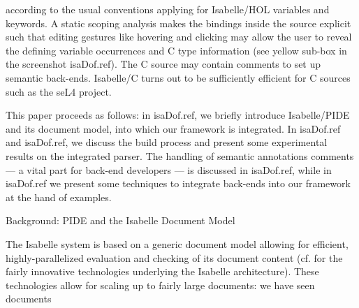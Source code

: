 \begin{isabellebody}
\begin{isamarkuptext}
according to the usual conventions applying for Isabelle/HOL variables and keywords. A static
scoping analysis makes the bindings inside the source explicit such that editing gestures like
hovering and clicking may allow the user to reveal the defining variable occurrences and C type
information (see yellow sub-box in the screenshot \csname isaDof.ref). The C source
may contain comments to set up semantic back-ends. Isabelle/C turns out to be sufficiently efficient
for C sources such as the seL4 project.%
\end{isamarkuptext}\isamarkuptrue%
%
\begin{isamarkuptext}%
This paper proceeds as follows: in \csname isaDof.ref, we
briefly introduce Isabelle/PIDE and its document model, into which our framework is integrated. In
\csname isaDof.ref and
\csname isaDof.ref, we discuss the build process and present some experimental results 
on the integrated parser. The handling of semantic annotations comments --- a vital part for 
back-end developers --- is discussed in \csname isaDof.ref, while in
\csname isaDof.ref we present some techniques to integrate back-ends
into our framework at the hand of examples.%
\end{isamarkuptext}\isamarkuptrue%
%
\begin{isamarkupsection*}%
[label = {background},type = {scholarly_paper.technical}, args={label = {background},type = {scholarly_paper.technical}, scholarly_paper.text_section.main_author = {@{docitem ''bu''}}, Isa_COL.text_element.level = {}, Isa_COL.text_element.referentiable = {False}, Isa_COL.text_element.variants = {{STR ''outline'', STR ''document''}}, scholarly_paper.text_section.fixme_list = {}, Isa_COL.text_element.level = {}, scholarly_paper.technical.definition_list = {}}]Background: PIDE and the Isabelle Document Model%
\end{isamarkupsection*}\isamarkuptrue%
%
\begin{isamarkuptext}%
\noindent{}The Isabelle system is based on a generic document model allowing for
efficient, highly-parallelized evaluation and checking of its document content (cf. 
\cite{DBLP:conf/itp/Wenzel14,DBLP:journals/corr/Wenzel14,DBLP:conf/mkm/BarrasGHRTWW13}
for the fairly innovative technologies underlying the Isabelle architecture).
These technologies allow for scaling up to fairly large  documents: we have seen documents

\end{isamarkuptext}
\end{isabellebody}
